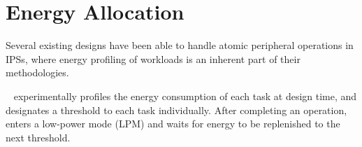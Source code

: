\section{Energy Allocation} \label{sec:c2_energyallocation}




Several existing designs have been able to handle atomic peripheral operations in IPSs, where energy profiling of workloads is an inherent part of their methodologies.

\debs{}~\cite{gomez2016dynamic} experimentally profiles the energy consumption of each task at design time, and designates a threshold to each task individually.
After completing an operation, \debs{} enters a low-power mode (LPM) and waits for energy to be replenished to the next threshold. 

